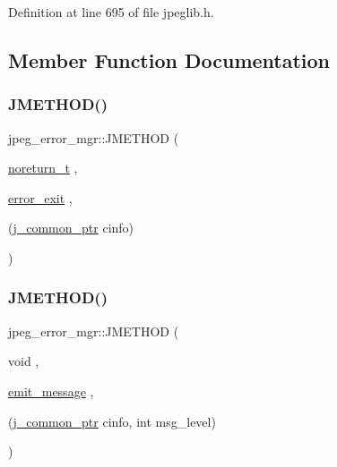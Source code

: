 Definition at line 695 of file jpeglib.\+h.



\subsection{Member Function Documentation}
\mbox{\label{structjpeg__error__mgr_a72c40bceda2e6cb78046165e6892ac3a}} 
\subsubsection{\texorpdfstring{JMETHOD()}{JMETHOD()}\hspace{0.1cm}{\footnotesize\ttfamily [1/5]}}
{\footnotesize\ttfamily jpeg\+\_\+error\+\_\+mgr\+::\+J\+M\+E\+T\+H\+OD (\begin{DoxyParamCaption}\item[{\mbox{\hyperlink{jmorecfg_8h_abaffdc8256e7ef5c7565ca45e6d3e628}{noreturn\+\_\+t}}}]{,  }\item[{\mbox{\hyperlink{jerror_8c_ac6efeb7cb80ae59d9ccdf1a16e20b2ff}{error\+\_\+exit}}}]{,  }\item[{(\mbox{\hyperlink{jpeglib_8h_a1a177ab705cefea8f30ec31a48e62650}{j\+\_\+common\+\_\+ptr}} cinfo)}]{ }\end{DoxyParamCaption})}

\mbox{\label{structjpeg__error__mgr_a73c0a027b6e6cb8ff2b7b0fc42f756f9}} 
\subsubsection{\texorpdfstring{JMETHOD()}{JMETHOD()}\hspace{0.1cm}{\footnotesize\ttfamily [2/5]}}
{\footnotesize\ttfamily jpeg\+\_\+error\+\_\+mgr\+::\+J\+M\+E\+T\+H\+OD (\begin{DoxyParamCaption}\item[{void}]{,  }\item[{\mbox{\hyperlink{jerror_8c_a0f5ad91b180dbac82fb322091d5b390a}{emit\+\_\+message}}}]{,  }\item[{(\mbox{\hyperlink{jpeglib_8h_a1a177ab705cefea8f30ec31a48e62650}{j\+\_\+common\+\_\+ptr}} cinfo, int msg\+\_\+level)}]{ }\end{DoxyParamCaption})}

